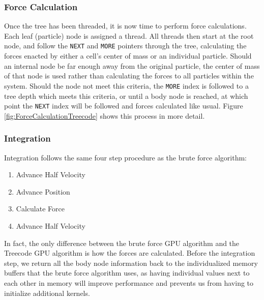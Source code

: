 \documentclass{thesis}
\begin{document}
\subsubsection{Force Calculation}
Once the tree has been threaded, it is now time to perform force calculations. Each leaf (particle) node is assigned a thread. All threads then start at the root node, and follow the \texttt{NEXT} and \texttt{MORE} pointers through the tree, calculating the forces enacted by either a cell's center of mass or an individual particle. Should an internal node be far enough away from the original particle, the center of mass of that node is used rather than calculating the forces to all particles within the system. Should the node not meet this criteria, the \texttt{MORE} index is followed to a tree depth which meets this criteria, or until a body node is reached, at which point the \texttt{NEXT} index will be followed and forces calculated like usual. Figure \ref{fig:ForceCalculationTreecode} shows this process in more detail.
\subsubsection{Integration}
Integration follows the same four step procedure as the brute force algorithm:
\begin{enumerate}[noitemsep]
    \item Advance Half Velocity
    \item Advance Position
    \item Calculate Force
    \item Advance Half Velocity
\end{enumerate}
In fact, the only difference between the brute force GPU algorithm and the Treecode GPU algorithm is how the forces are calculated. Before the integration step, we return all the body node information back to the individualized memory buffers that the brute force algorithm uses, as having individual values next to each other in memory will improve performance and prevents us from having to initialize additional kernels.
\end{document}
